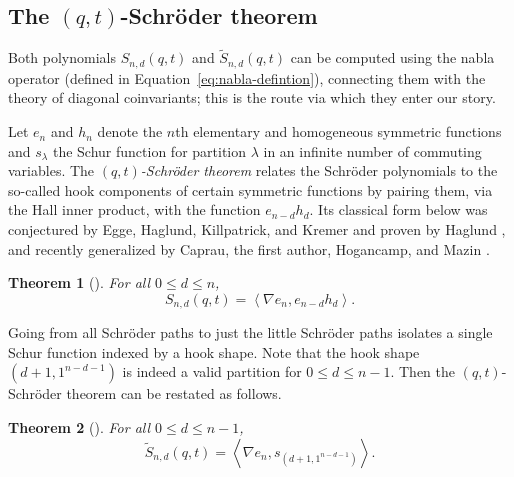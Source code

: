 \documentclass[11pt, noadjust, reqno]{amsart}
\newtheorem{theorem}{Theorem}[section]
\theoremstyle{definition}
\theoremstyle{remark}
\numberwithin{equation}{section}
\newcommand{\0}{\emptyset}
\begin{document}
\subsection{The \texorpdfstring{$(q,t)$}{(q,t)}-Schr\"oder theorem}
Both polynomials $S_{n,d}(q,t)$ and $\widetilde{S}_{n,d}(q,t)$ can be computed using the nabla operator (defined in Equation~\eqref{eq:nabla-defintion}), connecting them with the theory of diagonal coinvariants; this is the route via which they enter our story.

Let $e_n$ and $h_n$ denote the $n$th elementary and homogeneous symmetric functions and $s_\lambda$ the Schur function for partition $\lambda$ in an infinite number of commuting variables. The \emph{$(q,t)$-Schr\"oder theorem} relates the Schr\"oder polynomials to the so-called hook components of certain symmetric functions by pairing them, via the Hall inner product, with the function $e_{n-d}h_d$. Its classical form below was conjectured by Egge, Haglund, Killpatrick, and Kremer \cite{EggeHaglundKillpatrickKremer} and proven by Haglund \cite{Haglund2004}, and recently generalized by Caprau, the first author, Hogancamp, and Mazin \cite{CGHM}.

\begin{theorem}[\cite{Haglund2004}]\label{thm:qt-Schroeder-two-hooks}
    For all $0 \leq d \leq n$,
    \begin{equation*}
        S_{n,d}(q,t) = \left\langle \nabla e_n, e_{n-d} h_d \right\rangle.
    \end{equation*}
\end{theorem}

Going from all Schr\"oder paths to just the little Schr\"oder paths isolates a single Schur function indexed by a hook shape. 
Note that the hook shape $(d+1,1^{n-d-1})$ is indeed a valid partition for $0 \leq d \leq n-1$.
Then the $(q,t)$-Schr\"oder theorem can be restated as follows.
\begin{theorem}[{\cite[Theorem 4.3]{Haglund2008}}]\label{thm:qt-Schroeder-one-hook}
    For all $0 \leq d \leq n-1$, 
    \begin{equation*}
        \widetilde{S}_{n,d}(q,t) = \left\langle \nabla e_n, s_{(d+1,1^{n-d-1})} \right\rangle.
    \end{equation*}
\end{theorem}
\end{document}
